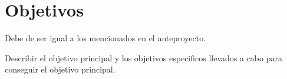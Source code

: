 \chapter{Objetivos}
\label{ch:objetivos}

Debe de ser igual a los mencionados en el anteproyecto.

Describir el objetivo principal y los objetivos especificos llevados a cabo para conseguir el objetivo principal.
